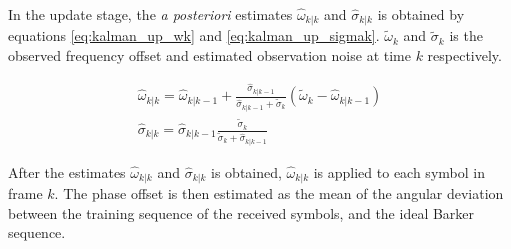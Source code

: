 In the update stage, the \textit{a posteriori} estimates $\widehat{\omega}_{k | k}$ and $\widehat{\sigma}_{k | k}$ is obtained by equations \ref{eq:kalman_up_wk} and \ref{eq:kalman_up_sigmak}. $\widetilde{\omega}_k$ and $\widetilde{\sigma}_{k}$ is the observed frequency offset and estimated observation noise at time $k$ respectively.

\begin{gather}
\widehat{\omega}_{k | k} = \widehat{\omega}_{k | k-1} + \frac{\widehat{\sigma}_{k | k-1}}{\widehat{\sigma}_{k | k-1} + \widetilde{\sigma}_{k}} ( \widetilde{\omega}_{k} - \widehat{\omega}_{k | k-1} )  \label{eq:kalman_up_wk} \\
\widehat{\sigma}_{k | k} = \widehat{\sigma}_{k | k-1} \frac{\widetilde{\sigma}_{k}}{\widetilde{\sigma}_{k} + \widehat{\sigma}_{k | k-1}  } \label{eq:kalman_up_sigmak} 
\end{gather} 

After the estimates $\widehat{\omega}_{k | k}$ and $\widehat{\sigma}_{k | k}$ is obtained, $\widehat{\omega}_{k | k}$ is applied to each symbol in frame $k$. The phase offset is then estimated as the mean of the angular deviation between the training sequence of the received symbols, and the ideal Barker sequence.


